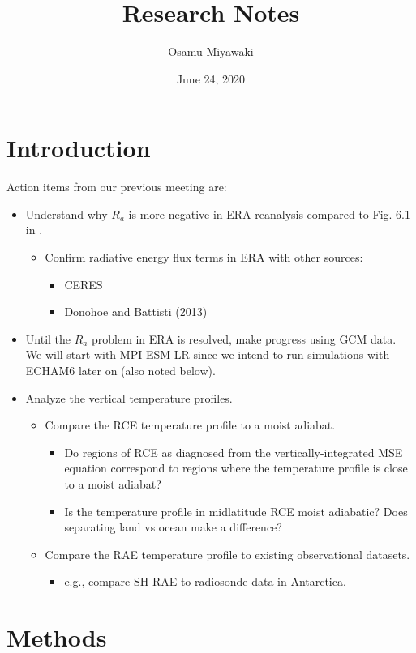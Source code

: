 \documentclass[11pt]{article}
\author{Osamu Miyawaki}
\date{June 24, 2020}
\title{Research Notes}
\begin{document}
\maketitle

\section{Introduction}
\label{sec:org5b0c5a8}
Action items from our previous meeting are:
\begin{itemize}
\item Understand why \(R_a\) is more negative in ERA reanalysis compared to Fig. 6.1 in \cite{hartmann_global_2016}.
\begin{itemize}
\item Confirm radiative energy flux terms in ERA with other sources:
\begin{itemize}
\item CERES
\item Donohoe and Battisti (2013)
\end{itemize}
\end{itemize}
\item Until the \(R_a\) problem in ERA is resolved, make progress using GCM data. We will start with MPI-ESM-LR since we intend to run simulations with ECHAM6 later on (also noted below).
\item Analyze the vertical temperature profiles.
\begin{itemize}
\item Compare the RCE temperature profile to a moist adiabat.
\begin{itemize}
\item Do regions of RCE as diagnosed from the vertically-integrated MSE equation correspond to regions where the temperature profile is close to a moist adiabat?
\item Is the temperature profile in midlatitude RCE moist adiabatic? Does separating land vs ocean make a difference?
\end{itemize}
\item Compare the RAE temperature profile to existing observational datasets.
\begin{itemize}
\item e.g., compare SH RAE to radiosonde data in Antarctica.
\end{itemize}
\end{itemize}
\end{itemize}

\section{Methods}
\label{sec:org3369ab4}
\end{document}
